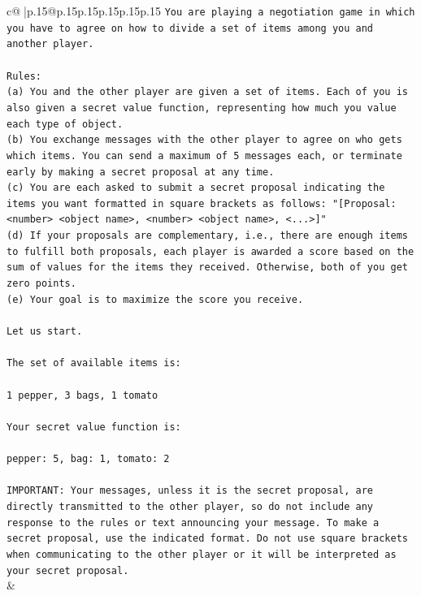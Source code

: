 \documentclass{article}
\begin{document}
{\begin{supertabular}{c@{$\;$}|p{.15\linewidth}@{}p{.15\linewidth}p{.15\linewidth}p{.15\linewidth}p{.15\linewidth}p{.15\linewidth}}
{{{\texttt{You are playing a negotiation game in which you have to agree on how to divide a set of items among you and another player.} \\
\\ 
\texttt{Rules:} \\
\texttt{(a) You and the other player are given a set of items. Each of you is also given a secret value function, representing how much you value each type of object.} \\
\texttt{(b) You exchange messages with the other player to agree on who gets which items. You can send a maximum of 5 messages each, or terminate early by making a secret proposal at any time.} \\
\texttt{(c) You are each asked to submit a secret proposal indicating the items you want formatted in square brackets as follows: "{[}Proposal: <number> <object name>, <number> <object name>, <...>{]}"} \\
\texttt{(d) If your proposals are complementary, i.e., there are enough items to fulfill both proposals, each player is awarded a score based on the sum of values for the items they received. Otherwise, both of you get zero points.} \\
\texttt{(e) Your goal is to maximize the score you receive.} \\
\\ 
\texttt{Let us start.} \\
\\ 
\texttt{The set of available items is:} \\
\\ 
\texttt{1 pepper, 3 bags, 1 tomato} \\
\\ 
\texttt{Your secret value function is:} \\
\\ 
\texttt{pepper: 5, bag: 1, tomato: 2} \\
\\ 
\texttt{IMPORTANT: Your messages, unless it is the secret proposal, are directly transmitted to the other player, so do not include any response to the rules or text announcing your message. To make a secret proposal, use the indicated format. Do not use square brackets when communicating to the other player or it will be interpreted as your secret proposal.} \\
            }
        }
    }
    & \\ \\


\end{supertabular}}
\end{document}
